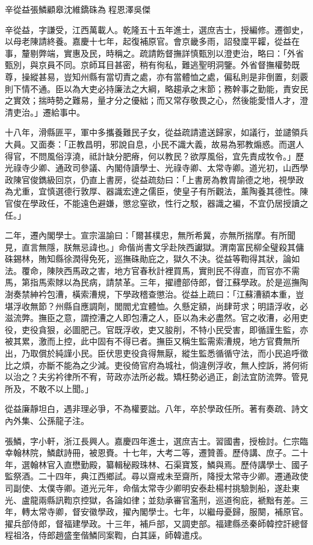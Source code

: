 
\begin{pinyinscope}
辛從益張鱗顧皋沈維鐈硃為程恩澤吳傑

辛從益，字謙受，江西萬載人。乾隆五十五年進士，選庶吉士，授編修。遷御史，以母老陳請終養。嘉慶十七年，起復補原官。會京畿多雨，詔發廩平糶，從益在事，釐剔弊端，實惠及民，時稱之。疏請飭督撫詳慎甄別以澄吏治，略曰：「外省甄別，與京員不同。京師耳目甚密，稍有徇私，難逃聖明洞鑒。外省督撫權勢既尊，操縱甚易，豈知州縣有當切責之處，亦有當體恤之處，偏私則是非倒置，刻覈則下情不通。臣以為大吏必持廉法之大綱，略趨承之末節；務幹事之勤能，責安民之實效；揣時勢之難易，量才分之優絀；而又常存敬畏之心，然後能愛惜人才，澄清吏治。」遷給事中。

十八年，滑縣匪平，軍中多攜養難民子女，從益疏請遣送歸家，如議行，並譴領兵大員。又面奏：「正教昌明，邪說自息，小民不識大義，故易為邪教煽惑。而選人得官，不問風俗淳澆，祗計缺分肥瘠，何以教民？欲厚風俗，宜先責成牧令。」歷光祿寺少卿、通政司參議、內閣侍讀學士、光祿寺卿、太常寺卿。道光初，山西學政陳官俊鐫級回京，仍直上書房，從益疏劾曰：「上書房為教胄諭德之地，視學政為尤重，宜慎選德行敦厚、器識宏達之儒臣，使皇子有所觀法，薰陶養其德性。陳官俊在學政任，不能遠色避嫌，懲忿窒欲，性行之駁，器識之褊，不宜仍居授讀之任。」

二年，遷內閣學士。宣宗溫諭曰：「爾甚樸忠，無所希冀，亦無所揣摩。有所聞見，直言無隱，朕無忌諱也。」命偕尚書文孚赴陜西讞獄。渭南富民柳全璧殺其傭硃錫林，賄知縣徐潤得免死，巡撫硃勛庇之，獄久不決。從益等鞫得其狀，論如法。覆命，陳陜西馬政之害，地方官春秋計裡買馬，實則民不得直，而官亦不需馬，第指馬索賕以為民病，請禁革。三年，擢禮部侍郎，督江蘇學政。於是巡撫陶澍奏禁紳衿包漕，橫索漕規，下學政稽查懲治。從益上疏曰：「江蘇漕額本重，豈堪浮收無節？州縣自應調劑，閭閻尤宜體恤。久懸定額，尚肆苛求；明語浮收，必滋流弊。撫臣之意，謂控漕之人即包漕之人，臣以為未必盡然。官之收漕，必用吏役，吏役貪狠，必圖肥己。官既浮收，吏又朘削，不特小民受害，即循謹生監，亦被其累，激而上控，此中固有不得已者。撫臣又稱生監需索漕規，地方官費無所出，乃取償於純謹小民。臣伏思吏役貪得無厭，縱生監悉循循守法，而小民追呼徵比之煩，亦斷不能為之少減。吏役倚官府為城社，倘違例浮收，無人控訴，將何術以治之？夫劣衿律所不宥，苛政亦法所必裁。矯枉勢必過正，創法宜防流弊。管見所及，不敢不以上聞。」

從益廉靜坦白，遇非理必爭，不為權要詘。八年，卒於學政任所。著有奏疏、詩文內外集、公孫龍子注。

張鱗，字小軒，浙江長興人。嘉慶四年進士，選庶吉士。習國書，授檢討。仁宗臨幸翰林院，鱗獻詩冊，被恩賚。十七年，大考二等，遷贊善。歷侍講、庶子。二十年，選翰林官入直懋勤殿，纂輯秘殿珠林、石渠寶笈，鱗與焉。歷侍講學士、國子監祭酒。二十四年，典江西鄉試。尋以齋戒未至齋所，降授太常寺少卿。遷通政使司副使、太僕寺卿。道光元年，命偕太常寺少卿明安泰赴楊村挑驗剝船，遂赴東光、盧龍兩縣訊鞫京控獄，各論如律；並劾承審官濫刑，巡道徇庇，褫黜有差。三年，轉太常寺卿，督安徽學政，擢內閣學士。七年，以繼母憂歸，服闋，補原官。擢兵部侍郎，督福建學政。十三年，補戶部，又調吏部。福建縣丞秦師韓控訐總督程祖洛，侍郎趙盛奎偕鱗同案鞫，白其誣，師韓遣戍。


\end{pinyinscope}
